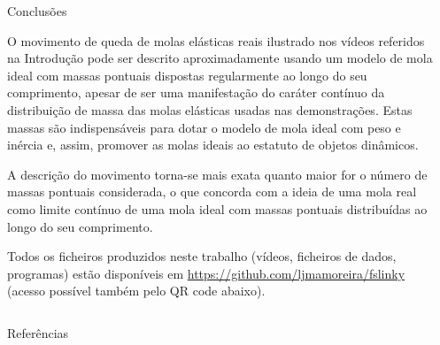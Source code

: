 \documentclass[final]{beamer}
\newlength{\sepwidth}
\newlength{\colwidth}
\newcommand{\separatorcolumn}{\begin{column}{\sepwidth}\end{column}}
\begin{document}
\begin{frame}[t]
\begin{columns}[t]
\begin{column}{\colwidth}

\begin{exampleblock}{Conclusões}

O movimento de queda de molas elásticas reais ilustrado nos vídeos referidos na
Introdução pode ser descrito aproximadamente usando um modelo de mola ideal com
massas pontuais dispostas regularmente ao longo do seu comprimento, apesar de
ser uma manifestação do caráter contínuo da distribuição de massa das molas
elásticas usadas nas demonstrações. Estas massas são indispensáveis para dotar o
modelo de mola ideal com peso e inércia e, assim, promover as molas ideais ao
estatuto de objetos dinâmicos.

A descrição do movimento torna-se mais exata quanto maior for o número de massas
pontuais considerada, o que concorda com a ideia de uma mola real como limite
contínuo de uma mola ideal com massas pontuais distribuídas ao longo do seu
comprimento. 

Todos os ficheiros produzidos neste trabalho (vídeos, ficheiros de dados, programas) estão disponíveis em \url{https://github.com/ljmamoreira/fslinky} (acesso possível também pelo QR code abaixo).

\end{exampleblock}
\end{column}
\separatorcolumn
\end{columns}



\begin{columns}[t]
\begin{column}{0.9328981723\paperwidth}
\begin{block}{Referências}
\begin{multicols}{2}
	
	\begin{multicols}{3}
	    \nocite{*}
	    \scriptsize
	    
	    
	\end{multicols} 
	
	\hfill
	

\end{multicols}
\end{block}
\end{column}
\end{columns}
\end{frame}
\end{document}
